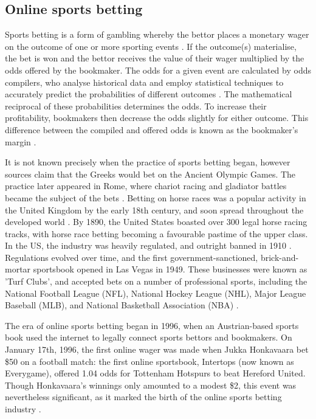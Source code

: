 \subsection{Online sports betting}
\label{background-bet}

Sports betting is a form of gambling whereby the bettor places a monetary wager on the outcome of one or more sporting events \cite{sportsbettingworld}. If the outcome(s) materialise, the bet is won and the bettor receives the value of their wager multiplied by the odds offered by the bookmaker. The odds for a given event are calculated by odds compilers, who analyse historical data and employ statistical techniques to accurately predict the probabilities of different outcomes \cite{oddscompiler}. The mathematical reciprocal of these probabilities determines the odds. To increase their profitability, bookmakers then decrease the odds slightly for either outcome. This difference between the compiled and offered odds is known as the bookmaker's margin \cite{margin}.

It is not known precisely when the practice of sports betting began, however sources claim that the Greeks would bet on the Ancient Olympic Games. The practice later appeared in Rome, where chariot racing and gladiator battles became the subject of the bets \cite{historybetting}. Betting on horse races was a popular activity in the United Kingdom by the early 18th century, and soon spread throughout the developed world \cite{historybetting-lamb}. By 1890, the United States boasted over 300 legal horse racing tracks, with horse race betting becoming a favourable pastime of the upper class. In the US, the industry was heavily regulated, and outright banned in 1910 \cite{historybetting-gray-1}. Regulations evolved over time, and the first government-sanctioned, brick-and-mortar sportsbook opened in Las Vegas in 1949. These businesses were known as 'Turf Clubs', and accepted bets on a number of professional sports, including the National Football League (NFL), National Hockey League (NHL), Major League Baseball (MLB), and National Basketball Association (NBA) \cite{historybetting-gray-2}.

The era of online sports betting began in 1996, when an Austrian-based sports book used the internet to legally connect sports bettors and bookmakers. On January 17th, 1996, the first online wager was made when Jukka Honkavaara bet \$50 on a football match: the first online sportsbook, Intertops (now known as Everygame), offered 1.04 odds for Tottenham Hotspurs to beat Hereford United. Though Honkavaara's winnings only amounted to a modest \$2, this event was nevertheless significant, as it marked the birth of the online sports betting industry \cite{historyonlinegambling}. 


